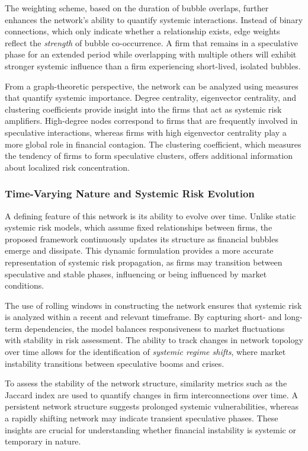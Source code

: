 \documentclass[preprint,12pt,authoryear]{elsarticle}
\begin{document}
The weighting scheme, based on the duration of bubble overlaps, further enhances the network's ability to quantify systemic interactions. Instead of binary connections, which only indicate whether a relationship exists, edge weights reflect the \textit{strength} of bubble co-occurrence. A firm that remains in a speculative phase for an extended period while overlapping with multiple others will exhibit stronger systemic influence than a firm experiencing short-lived, isolated bubbles.

From a graph-theoretic perspective, the network can be analyzed using measures that quantify systemic importance. Degree centrality, eigenvector centrality, and clustering coefficients provide insight into the firms that act as systemic risk amplifiers. High-degree nodes correspond to firms that are frequently involved in speculative interactions, whereas firms with high eigenvector centrality play a more global role in financial contagion. The clustering coefficient, which measures the tendency of firms to form speculative clusters, offers additional information about localized risk concentration.

\subsubsection{Time-Varying Nature and Systemic Risk Evolution}  

A defining feature of this network is its ability to evolve over time. Unlike static systemic risk models, which assume fixed relationships between firms, the proposed framework continuously updates its structure as financial bubbles emerge and dissipate. This dynamic formulation provides a more accurate representation of systemic risk propagation, as firms may transition between speculative and stable phases, influencing or being influenced by market conditions.

The use of rolling windows in constructing the network ensures that systemic risk is analyzed within a recent and relevant timeframe. By capturing short- and long-term dependencies, the model balances responsiveness to market fluctuations with stability in risk assessment. The ability to track changes in network topology over time allows for the identification of \textit{systemic regime shifts}, where market instability transitions between speculative booms and crises.

To assess the stability of the network structure, similarity metrics such as the Jaccard index are used to quantify changes in firm interconnections over time. A persistent network structure suggests prolonged systemic vulnerabilities, whereas a rapidly shifting network may indicate transient speculative phases. These insights are crucial for understanding whether financial instability is systemic or temporary in nature.
\end{document}
